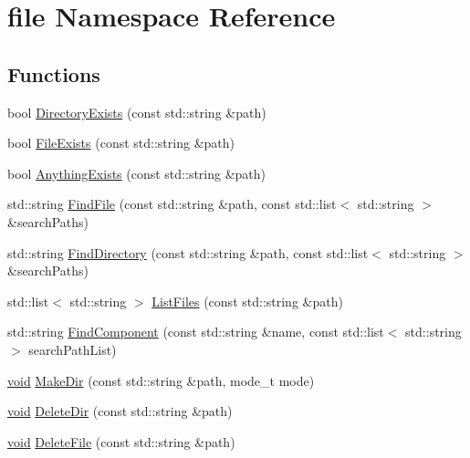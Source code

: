 \hypertarget{namespacefile}{}\section{file Namespace Reference}
\label{namespacefile}
\subsection*{Functions}
\begin{DoxyCompactItemize}
\item 
bool \hyperlink{namespacefile_af29219f6f2d987998bc8158f6f94f703}{Directory\+Exists} (const std\+::string \&path)
\item 
bool \hyperlink{namespacefile_aab94088fcc5a63516c8b0cf36d494326}{File\+Exists} (const std\+::string \&path)
\item 
bool \hyperlink{namespacefile_a7ea41d106bb273216b7213c22bbde2b0}{Anything\+Exists} (const std\+::string \&path)
\item 
std\+::string \hyperlink{namespacefile_a00f347aaef409f308f0ac6ce780bb75e}{Find\+File} (const std\+::string \&path, const std\+::list$<$ std\+::string $>$ \&search\+Paths)
\item 
std\+::string \hyperlink{namespacefile_a13dcb77fbfd40d37e504383e77b13f21}{Find\+Directory} (const std\+::string \&path, const std\+::list$<$ std\+::string $>$ \&search\+Paths)
\item 
std\+::list$<$ std\+::string $>$ \hyperlink{namespacefile_a28c3ff9946504fd51726f1c1ecb17995}{List\+Files} (const std\+::string \&path)
\item 
std\+::string \hyperlink{namespacefile_a9f765cbeef916bf3f9cb41061603b47e}{Find\+Component} (const std\+::string \&name, const std\+::list$<$ std\+::string $>$ search\+Path\+List)
\item 
\hyperlink{_t_e_m_p_l_a_t_e__cdef_8h_ac9c84fa68bbad002983e35ce3663c686}{void} \hyperlink{namespacefile_ae8cb0e4fe75caa70d5ac2d4c1020ef5d}{Make\+Dir} (const std\+::string \&path, mode\+\_\+t mode)
\item 
\hyperlink{_t_e_m_p_l_a_t_e__cdef_8h_ac9c84fa68bbad002983e35ce3663c686}{void} \hyperlink{namespacefile_aeb071803efe3291b2bfee27245215a1a}{Delete\+Dir} (const std\+::string \&path)
\item 
\hyperlink{_t_e_m_p_l_a_t_e__cdef_8h_ac9c84fa68bbad002983e35ce3663c686}{void} \hyperlink{namespacefile_a0f64f7412dad76936ec19dda0ca1416d}{Delete\+File} (const std\+::string \&path)
\end{DoxyCompactItemize}



